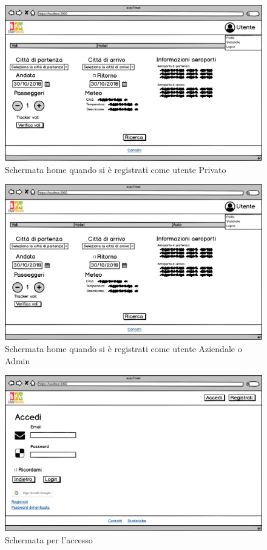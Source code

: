 \documentclass[11pt]{article}
\begin{document}
\begin{figure}[!ht]
	\includegraphics[width=1\textwidth]{./Mockup/Voli-user} %
	\caption{Schermata home quando si è registrati come utente Privato}
	\label{fig:homeuser}
\end{figure}

\begin{figure}[!ht]
	\includegraphics[width=1\textwidth]{./Mockup/Voli-aziendale-admin} %
	\caption{Schermata home quando si è registrati come utente Aziendale o Admin}
	\label{fig:homeaziendaleadmin}
\end{figure}

\begin{figure}[!ht]
	\includegraphics[width=1\textwidth]{./Mockup/Accesso} %
	\caption{Schermata per l'accesso}
	\label{fig:accesso}
\end{figure}
\end{document}
